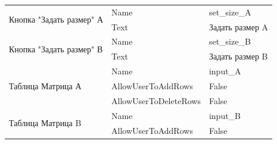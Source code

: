\begin{longtable}{|l|l|l|}
\multirow{2}{*}{Кнопка "Задать размер" А}                                                     & Name                                                                           & set\_size\_A                                                               \\ \cline{2-3} 
                                                                                              & Text                                                                           & Задать размер A                                                            \\ \hline
\multirow{2}{*}{Кнопка "Задать размер" В}                                                     & Name                                                                           & set\_size\_B                                                               \\ \cline{2-3} 
                                                                                              & Text                                                                           & Задать размер B                                                            \\ \hline
\multirow{3}{*}{Таблица Матрица А}                                                            & Name                                                                           & input\_A                                                                   \\ \cline{2-3} 
                                                                                              & AllowUserToAddRows                                                             & False                                                                      \\ \cline{2-3} 
                                                                                              & AllowUserToDeleteRows                                                          & False                                                                      \\ \hline
\multirow{3}{*}{Таблица Матрица B}                                                            & Name                                                                           & input\_B                                                                   \\ \cline{2-3} 
                                                                                              & AllowUserToAddRows                                                             & False                                                                      \\ \cline{2-3} 

\end{longtable}
